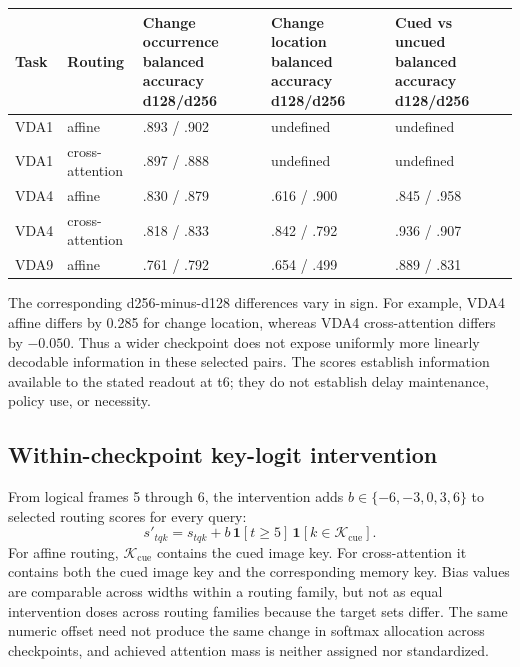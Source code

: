 \documentclass[11pt,a4paper]{article}
\begin{document}
\begingroup\small
{}\label{tab:decoder-scores}
\begin{tabularx}{\textwidth}{@{}p{3.0cm}p{2.2cm}Y Y Y@{}}
\toprule
Task & Routing & Change occurrence balanced accuracy d128/d256 & Change location balanced accuracy d128/d256 & Cued vs uncued balanced accuracy d128/d256\\
\midrule
VDA1 & affine & .893 / .902 & undefined & undefined\\
VDA1 & cross-attention & .897 / .888 & undefined & undefined\\
VDA4 & affine & .830 / .879 & .616 / .900 & .845 / .958\\
VDA4 & cross-attention & .818 / .833 & .842 / .792 & .936 / .907\\
VDA9 & affine & .761 / .792 & .654 / .499 & .889 / .831\\
\bottomrule
\end{tabularx}
\endgroup

The corresponding d256-minus-d128 differences vary in sign. For example, VDA4 affine differs by 0.285 for change location, whereas VDA4 cross-attention differs by $-0.050$. Thus a wider checkpoint does not expose uniformly more linearly decodable information in these selected pairs. The scores establish information available to the stated readout at t6; they do not establish delay maintenance, policy use, or necessity.

\subsection{Within-checkpoint key-logit intervention}
From logical frames 5 through 6, the intervention adds $b\in\{-6,-3,0,3,6\}$ to selected routing scores for every query:
\begin{equation}
s'_{tqk}=s_{tqk}+b\,\mathbf{1}[t\geq5]\,\mathbf{1}[k\in\mathcal{K}_{\mathrm{cue}}].
\end{equation}
For affine routing, $\mathcal{K}_{\mathrm{cue}}$ contains the cued image key. For cross-attention it contains both the cued image key and the corresponding memory key. Bias values are comparable across widths within a routing family, but not as equal intervention doses across routing families because the target sets differ. The same numeric offset need not produce the same change in softmax allocation across checkpoints, and achieved attention mass is neither assigned nor standardized.
\end{document}
